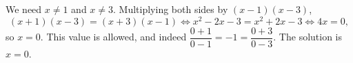 We need $x\ne1$ and $x\ne3$. Multiplying both sides by $(x-1)(x-3)$,
\[
(x+1)(x-3)=(x+3)(x-1)\iff x^2-2x-3=x^2+2x-3\iff4x=0 ,
\]
so $x=0$. This value is allowed, and indeed $\dfrac{0+1}{0-1}=-1=\dfrac{0+3}{0-3}$. The solution is $\boxed{x=0}$.
